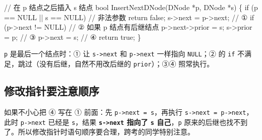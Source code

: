\documentclass[10.5pt,a4paper,oneside]{article}
\newcommand{\hlred}[1]{\textcolor{wdred}{\bfseries #1}}
\newenvironment{Shaded}{}{}
\newcommand{\CommentTok}[1]{\textcolor[rgb]{0.18,0.55,0.23}{#1}}
\newcommand{\ControlFlowTok}[1]{\textcolor[rgb]{0.12,0.31,0.71}{#1}}
\newcommand{\DataTypeTok}[1]{\textcolor[rgb]{0.12,0.31,0.71}{#1}}
\newcommand{\KeywordTok}[1]{\textcolor[rgb]{0.12,0.31,0.71}{#1}}
\newcommand{\NormalTok}[1]{#1}
\newcommand{\OperatorTok}[1]{\textcolor[rgb]{0.20,0.20,0.20}{#1}}
\begin{document}
\begin{Shaded}
\begin{Highlighting}[]
\CommentTok{// 在 p 结点之后插入 s 结点}
\DataTypeTok{bool}\NormalTok{ InsertNextDNode}\OperatorTok{(}\NormalTok{DNode }\OperatorTok{*}\NormalTok{p}\OperatorTok{,}\NormalTok{ DNode }\OperatorTok{*}\NormalTok{s}\OperatorTok{)} \OperatorTok{\{}
    \ControlFlowTok{if} \OperatorTok{(}\NormalTok{p }\OperatorTok{==}\NormalTok{ NULL }\OperatorTok{||}\NormalTok{ s }\OperatorTok{==}\NormalTok{ NULL}\OperatorTok{)}       \CommentTok{// 非法参数}
        \ControlFlowTok{return} \KeywordTok{false}\OperatorTok{;}
\NormalTok{    s}\OperatorTok{{-}\textgreater{}}\NormalTok{next }\OperatorTok{=}\NormalTok{ p}\OperatorTok{{-}\textgreater{}}\NormalTok{next}\OperatorTok{;}                \CommentTok{// ①}
    \ControlFlowTok{if} \OperatorTok{(}\NormalTok{p}\OperatorTok{{-}\textgreater{}}\NormalTok{next }\OperatorTok{!=}\NormalTok{ NULL}\OperatorTok{)}              \CommentTok{// ② 如果 p 结点有后继结点}
\NormalTok{        p}\OperatorTok{{-}\textgreater{}}\NormalTok{next}\OperatorTok{{-}\textgreater{}}\NormalTok{prior }\OperatorTok{=}\NormalTok{ s}\OperatorTok{;}
\NormalTok{    s}\OperatorTok{{-}\textgreater{}}\NormalTok{prior }\OperatorTok{=}\NormalTok{ p}\OperatorTok{;}                     \CommentTok{// ③}
\NormalTok{    p}\OperatorTok{{-}\textgreater{}}\NormalTok{next }\OperatorTok{=}\NormalTok{ s}\OperatorTok{;}                      \CommentTok{// ④}
    \ControlFlowTok{return} \KeywordTok{true}\OperatorTok{;}
\OperatorTok{\}}
\end{Highlighting}
\end{Shaded}

\texttt{p} 是最后一个结点时：① 让 \texttt{s-\textgreater{}next} 和
\texttt{p-\textgreater{}next} 一样指向 \texttt{NULL}；② 的 \texttt{if}
不满足，跳过（没有后继，自然不用改后继的 \texttt{prior}）；③④ 照常执行。

\hypertarget{ux4feeux6539ux6307ux9488ux8981ux6ce8ux610fux987aux5e8f}{%
\subsection{修改指针要注意顺序}\label{ux4feeux6539ux6307ux9488ux8981ux6ce8ux610fux987aux5e8f}}

\begin{pitfallbox}

如果不小心把 ④ 写在 ① 前面：先
\texttt{p-\textgreater{}next\ =\ s}，再执行
\texttt{s-\textgreater{}next\ =\ p-\textgreater{}next}，此时
\texttt{p-\textgreater{}next} 已经是 \texttt{s}，结果
\hlred{\texttt{s-\textgreater{}next} 指向了 \texttt{s} 自己}，\texttt{p}
原来的后继也找不到了。所以修改指针时语句顺序要合理，跨考的同学特别注意。

\end{pitfallbox}
\end{document}
